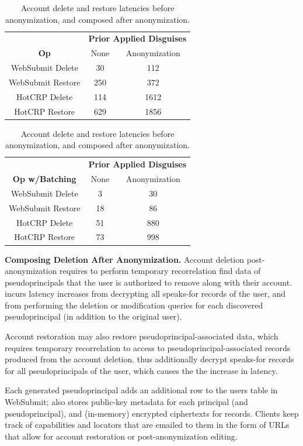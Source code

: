 \begin{table}[t!]
\begin{center}
\begin{tabular}{ c | c c }
& \multicolumn{2}{c}{\textbf{Prior Applied Disguises}} \\
    \textbf{Op} & None & Anonymization \\
\hline
WebSubmit Delete & 30 & 112 \\
WebSubmit Restore & 250 & 372\\
HotCRP Delete & 114 & 1612 \\
HotCRP Restore & 629 & 1856 \\
\end{tabular}
\quad
\begin{tabular}{ c | c c }
 & \multicolumn{2}{c}{\textbf{Prior Applied Disguises}} \\
    \textbf{Op w/Batching} & None & Anonymization \\
\hline
WebSubmit Delete  & 3 & 30 \\
WebSubmit Restore  & 18 & 86\\
HotCRP Delete  & 51 & 880 \\
HotCRP Restore  & 73 & 998
\end{tabular}
\end{center}
\caption{Account delete and restore latencies before anonymization, and composed after anonymization.}
\label{tab:composition}
\end{table}

\textbf{Composing Deletion After Anonymization.}
Account deletion post-anonymization requires \sys to perform temporary
recorrelation find data of pseudoprincipals that the user is authorized to remove along with their
account. \sys incurs latency increases from decrypting all speaks-for records of the user, and from
performing the deletion or modification queries for each discovered pseudoprincipal (in addition to
the original user).

Account restoration may also restore pseudoprincipal-associated data, which requires temporary recorrelation
to access to pseudoprincipal-associated records produced from the account deletion.  \sys thus
additionally decrypt speaks-for records for all pseudoprincipals of the user, which causes the the
increase in latency.


Each generated pseudoprincipal adds an additional row to the users table in WebSubmit; \sys also
stores public-key metadata for each principal (and pseudoprincipal), and (in-memory) encrypted
ciphertexts for records.  Clients keep track of capabilities and locators that are emailed to them in
the form of URLs that allow for account restoration or post-anonymization editing.

